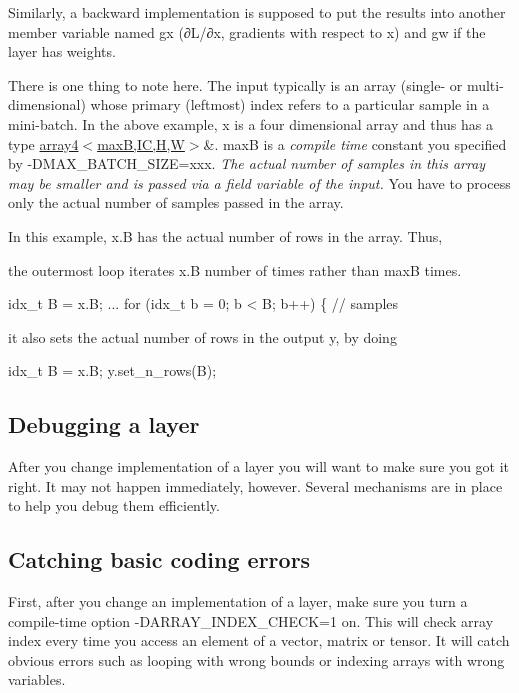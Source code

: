 Similarly, a backward implementation is supposed to put the results into another member variable named \textquotesingle{}gx\textquotesingle{} (∂\+L/∂x, gradients with respect to x) and \textquotesingle{}gw\textquotesingle{} if the layer has weights.

There is one thing to note here. The input typically is an array (single-\/ or multi-\/dimensional) whose primary (leftmost) index refers to a particular sample in a mini-\/batch. In the above example, x is a four dimensional array and thus has a type \hyperlink{structarray4}{array4$<$max\+B,\+I\+C,\+H,\+W$>$}\&. maxB is a {\itshape compile time} constant you specified by -\/\+D\+M\+A\+X\+\_\+\+B\+A\+T\+C\+H\+\_\+\+S\+I\+ZE=xxx. {\itshape The actual number of samples in this array may be smaller and is passed via a field variable of the input.} You have to process only the actual number of samples passed in the array.

In this example, x.\+B has the actual number of rows in the array. Thus,
\begin{DoxyItemize}
\item the outermost loop iterates x.\+B number of times rather than maxB times. 
\begin{DoxyCode}
idx\_t B = x.B;
 ...
for (idx\_t b = 0; b < B; b++) \{       // samples
\end{DoxyCode}

\item it also sets the actual number of rows in the output y, by doing 
\begin{DoxyCode}
idx\_t B = x.B;
y.set\_n\_rows(B);
\end{DoxyCode}

\end{DoxyItemize}

\subsection*{Debugging a layer }

After you change implementation of a layer you will want to make sure you got it right. It may not happen immediately, however. Several mechanisms are in place to help you debug them efficiently.

\subsection*{Catching basic coding errors }

First, after you change an implementation of a layer, make sure you turn a compile-\/time option -\/\+D\+A\+R\+R\+A\+Y\+\_\+\+I\+N\+D\+E\+X\+\_\+\+C\+H\+E\+CK=1 on. This will check array index every time you access an element of a vector, matrix or tensor. It will catch obvious errors such as looping with wrong bounds or indexing arrays with wrong variables.



